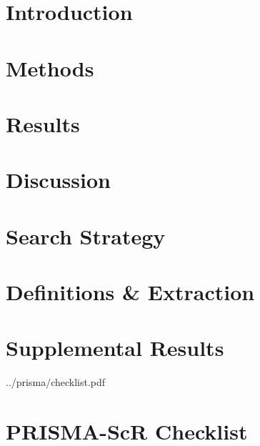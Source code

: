 \documentclass{article}
\begin{document}
\maketitle
\tableofcontents
\clearpage
\clearpage
\section{Introduction} \label{s:intro} 
\section{Methods}      \label{s:meth}  
\section{Results}      \label{s:res}   
\section{Discussion}   \label{s:disc}  
\clearpage
\printbibliography
\appendix
\clearpage
\section{Search Strategy}           \label{a:search}    \clearpage
\section{Definitions \& Extraction} \label{a:defs}        \clearpage
\section{Supplemental Results}      \label{a:results}  \clearpage
{}
{../prisma/checklist.pdf}
{\section{PRISMA-ScR Checklist}\label{a:prisma}}
\end{document}
